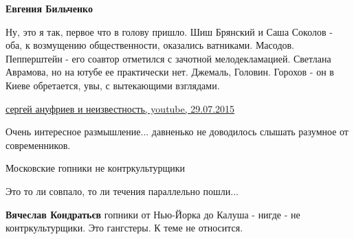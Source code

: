 \begin{itemize}
\begin{itemize}
 
\textbf{Евгения Бильченко} 

Ну, это я так, первое что в голову пришло. Шиш Брянский и Саша Соколов - оба, к
возмущению общественности, оказались ватниками. Масодов. Пепперштейн - его
соавтор отметился с зачотной мелодекламацией. Светлана Аврамова, но на ютубе ее
практически нет. Джемаль, Головин. Горохов - он в Киеве обретается, увы, с
вытекающими взглядами.

\href{https://www.youtube.com/watch?v=u81ms6pYUAc}{%
сергей ануфриев и неизвестность, youtube, 29.07.2015%
}
\end{itemize}

 
Очень интересное размышление... давненько не доводилось слышать разумное от современников.

 

Московские гопники не контркультурщики

Это то ли совпало, то ли течения параллельно пошли...

\begin{itemize}
 
\textbf{Вячеслав Кондратьєв} гопники от Нью-Йорка до Калуша - нигде - не контркультурщики. Это гангстеры. К теме не относится.

 

\end{itemize}
\end{itemize}
